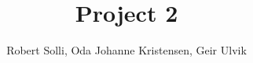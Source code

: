 \documentclass[12pt]{article}
\begin{document}
\title{Project 2}
\author{Robert Solli, Oda Johanne Kristensen, Geir Ulvik}
\maketitle








\end{document}
